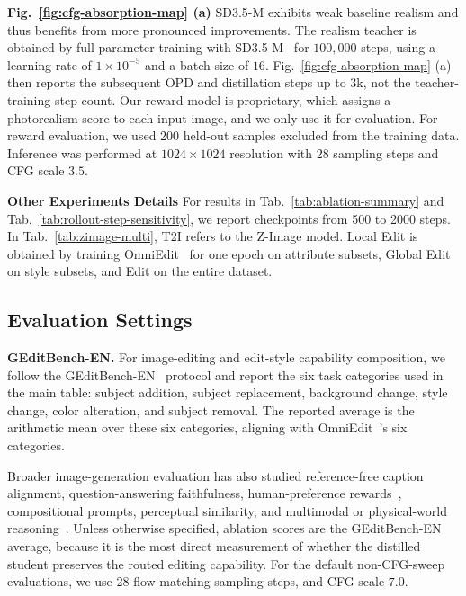 \noindent\textbf{Fig.~\ref{fig:cfg-absorption-map} (a)} SD3.5-M exhibits weak baseline realism and thus benefits from more pronounced improvements. The realism teacher is obtained by full-parameter training with SD3.5-M~\cite{esser2024scaling} for $100{,}000$ steps, using a learning rate of $1\times10^{-5}$ and a batch size of $16$. Fig.~\ref{fig:cfg-absorption-map} (a) then reports the subsequent OPD and distillation steps up to $3$k, not the teacher-training step count.
Our reward model is proprietary, which assigns a photorealism score to each input image, and we only use it for evaluation. For reward evaluation, we used $200$ held-out samples excluded from the training data. Inference was performed at $1024\times1024$ resolution with $28$ sampling steps and CFG scale $3.5$.

\noindent\textbf{Other Experiments Details}
For results in Tab.~\ref{tab:ablation-summary} and Tab.~\ref{tab:rollout-step-sensitivity}, we report checkpoints from 500 to 2000 steps. In Tab.~\ref{tab:zimage-multi}, T2I refers to the Z-Image model. Local Edit is obtained by training OmniEdit~\cite{wei2025omniedit} for one epoch on attribute subsets, Global Edit on style subsets, and Edit on the entire dataset.


\vspace{0.2cm}


\subsection{Evaluation Settings}
\label{app:evaluation-settings}





\noindent\textbf{GEditBench-EN.}
For image-editing and edit-style capability composition, we follow the GEditBench-EN~\cite{liu2025step1x} protocol and report the six task categories used in the main table: subject addition, subject replacement, background change, style change, color alteration, and subject removal. The reported average is the arithmetic mean over these six categories, aligning with OmniEdit~\cite{wei2025omniedit}'s six categories. 

Broader image-generation evaluation has also studied reference-free caption alignment, question-answering faithfulness, human-preference rewards~\cite{xu2023imagereward,kirstain2023pick,wu2023human}, compositional prompts, perceptual similarity, and multimodal or physical-world reasoning~\cite{hessel2021clipscore,hu2023tifa,huang2025t2i,fu2023dreamsim,chow2025physbench}. Unless otherwise specified, ablation scores are the GEditBench-EN average, because it is the most direct measurement of whether the distilled student preserves the routed editing capability. For the default non-CFG-sweep evaluations, we use 28 flow-matching sampling steps, and CFG scale $7.0$.

